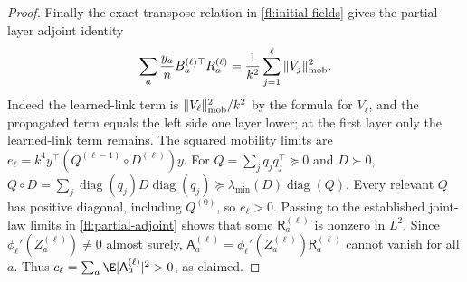 \begin{proof}
Finally the exact transpose relation in \eqref{fl:initial-fields} gives
the partial-layer adjoint identity
\begin{equation}
 \sum_a\frac{y_a}{n}B_a^{(\ell)\top}R_a^{(\ell)}
       =\frac1{k^2}\sum_{j=1}^{\ell}\|V_j\|_{\rm mob}^2.
 \label{fl:partial-adjoint}
\end{equation}
Indeed the learned-link term is $\|V_\ell\|_{\rm mob}^2/k^2$ by
the formula for $V_\ell$, and the propagated term equals the left side
one layer lower; at the first layer only the learned-link term remains.
The squared mobility limits are
$e_\ell=k^4y^\top(Q^{(\ell-1)}\circ D^{(\ell)})y$.
For $Q=\sum_jq_jq_j^\top\succeq0$ and $D\succ0$,
$Q\circ D=\sum_j\operatorname{diag}(q_j)D\operatorname{diag}(q_j)
\succeq\lambda_{\min}(D)\operatorname{diag}(Q)$.
Every relevant $Q$ has positive diagonal, including $Q^{(0)}$, so
$e_\ell>0$. Passing to the established joint-law limits in
\eqref{fl:partial-adjoint} shows that some $\mathsf R_a^{(\ell)}$ is
nonzero in $L^2$. Since $\phi_\ell'(Z_a^{(\ell)})\ne0$ almost surely,
$\mathsf A_a^{(\ell)}=\phi_\ell'(Z_a^{(\ell)})\mathsf R_a^{(\ell)}$
cannot vanish for all $a$. Thus
$c_\ell=\sum_a\E|\mathsf A_a^{(\ell)}|^2>0$, as claimed.
\end{proof}

